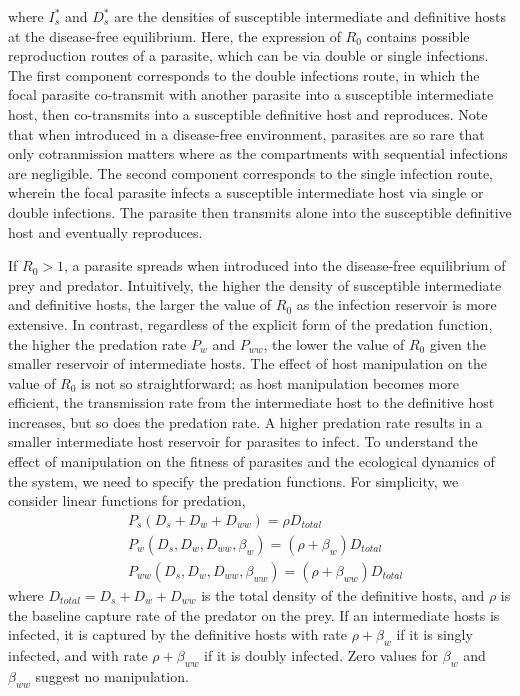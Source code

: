 \documentclass[11pt]{article}
\begin{document}
where $I_s^*$ and $D_s^*$ are the densities of susceptible intermediate and definitive hosts at the disease-free equilibrium. 
Here, the expression of $R_0$ contains possible reproduction routes of a parasite, which can be via double or single infections. 
The first component corresponds to the double infections route, in which the focal parasite co-transmit with another parasite into a susceptible intermediate host, then co-transmits into a susceptible definitive host and reproduces. 
Note that when introduced in a disease-free environment, parasites are so rare that only cotranmission matters where as the compartments with sequential infections are negligible. 
The second component corresponds to the single infection route, wherein the focal parasite infects a susceptible intermediate host via single or double infections. 
The parasite then transmits alone into the susceptible definitive host and eventually reproduces. 


If $R_0 > 1$, a parasite spreads when introduced into the disease-free equilibrium of prey and predator.
Intuitively, the higher the density of susceptible intermediate and definitive hosts, the larger the value of $R_0$ as the infection reservoir is more extensive. 
In contrast, regardless of the explicit form of the predation function, the higher the predation rate $P_w$ and $P_{ww}$, the lower the value of $R_0$ given the smaller reservoir of intermediate hosts. 
The effect of host manipulation on the value of $R_0$ is not so straightforward; as host manipulation becomes more efficient, the transmission rate from the intermediate host to the definitive host increases, but so does the predation rate. 
A higher predation rate results in a smaller intermediate host reservoir for parasites to infect. 
To understand the effect of manipulation on the fitness of parasites and the ecological dynamics of the system, we need to specify the predation functions. 
For simplicity, we consider linear functions for predation,
%
\begin{align*}
& P_s(D_s + D_w + D_{ww}) = \rho D_{total}  \\
& P_w(D_s, D_w, D_{ww}, \beta_w) = (\rho + \beta_w) D_{total} \\
& P_{ww}(D_s, D_w, D_{ww}, \beta_{ww}) =  (\rho + \beta_{ww})D_{total}
\end{align*}
%
where $D_{total} = D_s + D_w + D_{ww}$ is the total density of the definitive hosts, and $\rho$ is the baseline capture rate of the predator on the prey. If an intermediate hosts is infected, it is captured by the definitive hosts with rate $\rho + \beta_w$ if it is singly infected, and with rate $\rho + \beta_{ww}$ if it is doubly infected. Zero values for $\beta_w$ and $\beta_{ww}$ suggest no manipulation. 
\end{document}
